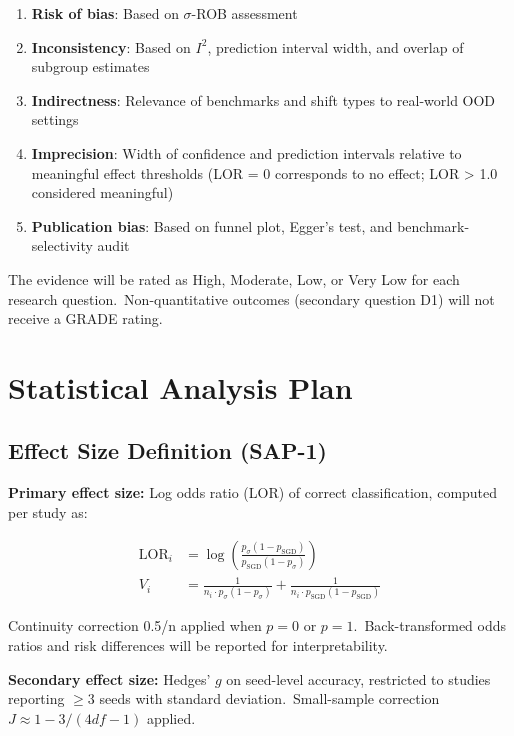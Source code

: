 \begin{enumerate}[nosep]
\item \textbf{Risk of bias}: Based on $\sigma$-ROB assessment
\item \textbf{Inconsistency}: Based on $I^2$, prediction interval width, and overlap of subgroup estimates
\item \textbf{Indirectness}: Relevance of benchmarks and shift types to real-world OOD settings
\item \textbf{Imprecision}: Width of confidence and prediction intervals relative to meaningful effect thresholds (LOR = 0 corresponds to no effect; LOR > 1.0 considered meaningful)
\item \textbf{Publication bias}: Based on funnel plot, Egger's test, and benchmark-selectivity audit
\end{enumerate}

The evidence will be rated as High, Moderate, Low, or Very Low for each research question.\ Non-quantitative outcomes (secondary question D1) will not receive a GRADE rating.

\section{Statistical Analysis Plan}

\subsection{Effect Size Definition (SAP-1)}

\textbf{Primary effect size:} Log odds ratio (LOR) of correct classification, computed per study as:

\begin{align}
\text{LOR}_i &= \log\left( \frac{p_\sigma (1 - p_{\text{SGD}})}{p_{\text{SGD}} (1 - p_\sigma)} \right) \\
V_i &= \frac{1}{n_i \cdot p_\sigma (1 - p_\sigma)} + \frac{1}{n_i \cdot p_{\text{SGD}} (1 - p_{\text{SGD}})}
\end{align}

Continuity correction 0.5/n applied when $p = 0$ or $p = 1$.\
Back-transformed odds ratios and risk differences will be reported for interpretability.

\textbf{Secondary effect size:} Hedges' $g$ on seed-level accuracy, restricted to studies reporting $\geq 3$ seeds with standard deviation.\ Small-sample correction $J \approx 1 - 3/(4df - 1)$ applied.

